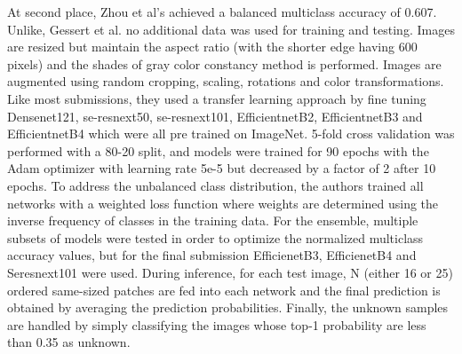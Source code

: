     At second place, Zhou et al's \cite{isic2019second} achieved a balanced multiclass accuracy of 0.607. Unlike, Gessert et al. no additional data was used for training and testing. Images are resized but maintain the aspect ratio (with the shorter edge having 600 pixels) and the shades of gray color constancy method \cite{shadesgray} is performed. Images are augmented using random cropping, scaling, rotations and color transformations. Like most submissions, they used a transfer learning approach by fine tuning Densenet121, se-resnext50, se-resnext101, EfficientnetB2, EfficientnetB3 and EfficientnetB4 which were all pre trained on ImageNet. 5-fold cross validation was performed with a 80-20 split, and models were trained for 90 epochs with the Adam optimizer \cite{adam} with learning rate 5e-5 but decreased by a factor of 2 after 10 epochs. To address the unbalanced class distribution, the authors trained all networks with a weighted loss function where weights are determined using the inverse frequency of classes in the training data. For the ensemble, multiple subsets of models were tested in order to optimize the normalized multiclass accuracy values, but for the final submission EfficienetB3, EfficienetB4 and Seresnext101 were used. During inference, for each test image, N (either 16 or 25) ordered same-sized patches are fed into each network and the final prediction is obtained by averaging the prediction probabilities. Finally, the unknown samples are handled by simply classifying the images whose top-1 probability are less than 0.35 as unknown.\par
    
